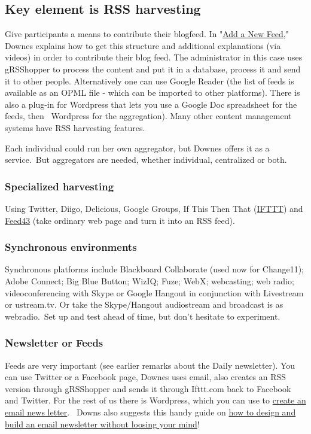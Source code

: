 \subsection{Key element is RSS harvesting}

Give participants a means to contribute their blogfeed. In
"\href{http://change.mooc.ca/new\_feed.htm}{Add a New Feed}," Downes
explains how to get this structure and additional explanations (via
videos) in order to contribute their blog feed. The administrator in
this case uses gRSShopper to process the content and put it in a
database, process it and send it to other people. Alternatively one can
use Google Reader (the list of feeds is available as an OPML file -
which can be imported to other platforms). There is also a plug-in for
Wordpress that lets you use a Google Doc spreadsheet for the feeds, then
~Wordpress for the aggregation). Many other content management systems
have RSS harvesting features.

Each individual could run her own aggregator, but Downes offers it as a
service.~But aggregators are needed, whether individual, centralized or
both.

\subsubsection{Specialized harvesting}

Using Twitter, Diigo, Delicious, Google Groups, If This Then That
(\href{http://ifttt.com}{IFTTT}) and \href{http://feed43.com}{Feed43}
(take ordinary web page and turn it into an RSS feed).

\subsubsection{Synchronous environments}

Synchronous platforms include Blackboard Collaborate (used now for
Change11); Adobe Connect; Big Blue Button; WizIQ; Fuze; WebX;
webcasting; web radio; videoconferencing with Skype or Google Hangout in
conjunction with Livestream or ustream.tv. Or take the Skype/Hangout
audiostream and broadcast is as webradio.~Set up and test ahead of time,
but don't hesitate to experiment.

\subsubsection{Newsletter or Feeds}

Feeds are very important (see earlier remarks about the Daily
newsletter). You can use Twitter or a Facebook page, Downes uses email,
also creates an RSS version through gRSShopper and sends it through
Ifttt.com back to Facebook and Twitter. For the rest of us there is
Wordpress, which you can use to
\href{http://www.wpbeginner.com/wp-tutorials/create-a-free-email-newsletter-service-using-wordpress/\%20}{create
an email news letter}.~ Downs also suggests this handy guide on
\href{http://www.smashingmagazine.com/2010/01/19/design-and-build-an-email-newsletter-without-losing-your-mind/}{how
to design and build an email newsletter without loosing your mind}!

